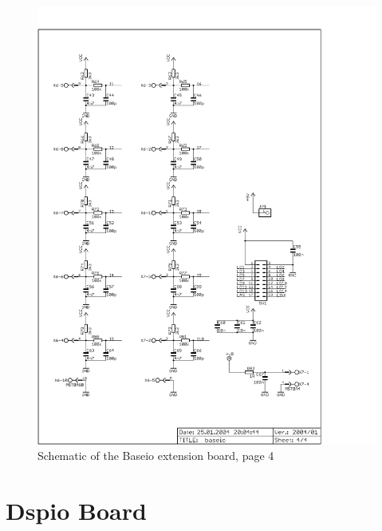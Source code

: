 \begin{figure}
    \centering
    \includegraphics[scale=0.68]{appendix/baseio_p4}
    \caption{Schematic of the Baseio extension board, page 4}
\end{figure}

\newpage
\section{Dspio Board} \label{appx:dspio}

